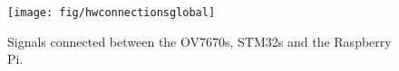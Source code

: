 \begin{figure}[ht!]
\begin{center}
\texttt{[image: fig/hwconnectionsglobal]}\\
\caption{Signals connected between the OV7670s, STM32s and the Raspberry Pi.}
\label{fig_hwconnectionsglobal}
\end{center}
\end{figure}
